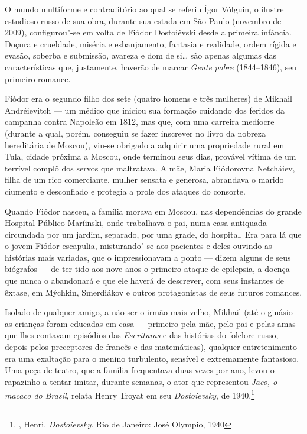 O mundo multiforme e contraditório ao qual se referiu
Ígor Vólguin, o ilustre estudioso russo de sua obra, durante sua
estada em São Paulo (novembro de 2009), configurou"-se em volta
de Fiódor Dostoiévski desde a primeira infância. Doçura e
crueldade, miséria e esbanjamento, fantasia e realidade,
ordem rígida e evasão, soberba e submissão, avareza e dom
de si\ldots{} são apenas algumas das características que,
justamente, haverão de marcar \emph{Gente pobre} (1844--1846),
seu primeiro romance.

Fiódor era o segundo filho dos sete (quatro homens e três
mulheres) de Mikhail Andréievitch --- um médico que iniciou
sua formação cuidando dos feridos da campanha contra Napoleão
em 1812, mas que, com uma carreira medíocre (durante a qual,
porém, conseguiu se fazer inscrever no livro da nobreza
hereditária de Moscou), viu-se obrigado a adquirir uma propriedade rural
em Tula, cidade próxima a Moscou, onde terminou seus dias,
provável vítima de um terrível complô dos servos que
maltratava. A mãe, Maria Fiódorovna Netcháiev, filha de um
rico comerciante, mulher sensata e generosa, abrandava o
marido ciumento e desconfiado e protegia a prole dos ataques do
consorte.

Quando Fiódor nasceu, a família morava em Moscou, nas dependências
do grande Hospital Público Maríinski, onde trabalhava o pai, numa
casa antiquada circundada por um jardim, separado, por uma grade,
do hospital. Era para lá que o jovem Fiódor escapulia,
misturando"-se aos pacientes e deles ouvindo as histórias mais
variadas, que o impressionavam a ponto --- dizem alguns de seus
biógrafos --- de ter tido aos nove anos o primeiro ataque de
epilepsia, a doença que nunca o abandonará e que ele haverá
de descrever, com seus instantes de êxtase, em Mýchkin,
Smerdiákov e outros protagonistas de seus futuros romances.

Isolado de qualquer amigo, a não ser o irmão mais velho, Mikhail
(até o ginásio as crianças foram educadas em casa --- primeiro
pela mãe, pelo pai e pelas amas que lhes contavam episódios das
\emph{Escrituras} e das histórias do folclore russo, depois pelos
preceptores de francês e das matemáticas), qualquer entretenimento
era uma exaltação para o menino turbulento, sensível e extremamente fantasioso. Uma peça de teatro, que a família frequentava duas vezes por ano, levou o rapazinho a tentar
imitar, durante semanas, o ator que representou \emph{Jaco, o
macaco do Brasil}, relata Henry Troyat em seu \emph{Dostoievsky},
de 1940.\footnote{, Henri. \emph{Dostoievsky}.
Rio de Janeiro: José Olympio, 1940}

